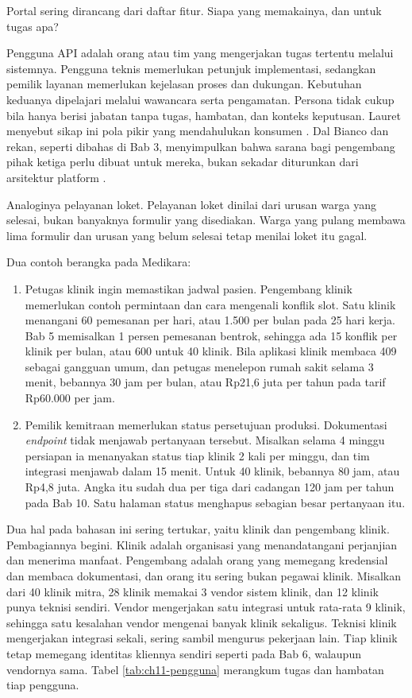 Portal sering dirancang dari daftar fitur. Siapa yang memakainya, dan untuk tugas apa?

Pengguna API adalah orang atau tim yang mengerjakan tugas tertentu melalui sistemnya. Pengguna teknis memerlukan petunjuk
implementasi, sedangkan pemilik layanan memerlukan kejelasan proses dan dukungan. Kebutuhan keduanya dipelajari melalui
wawancara serta pengamatan. Persona tidak cukup bila hanya berisi jabatan tanpa tugas, hambatan, dan konteks keputusan.
Lauret menyebut sikap ini pola pikir yang mendahulukan konsumen \cite{lauret2025design}. Dal Bianco dan rekan, seperti
dibahas di Bab 3, menyimpulkan bahwa sarana bagi pengembang pihak ketiga perlu dibuat untuk mereka, bukan sekadar
diturunkan dari arsitektur platform \cite{dalbianco2014role}.

Analoginya pelayanan loket. Pelayanan loket dinilai dari urusan warga yang selesai, bukan banyaknya formulir yang
disediakan. Warga yang pulang membawa lima formulir dan urusan yang belum selesai tetap menilai loket itu gagal.

Dua contoh berangka pada Medikara:
\begin{enumerate}
  \item Petugas klinik ingin memastikan jadwal pasien. Pengembang klinik memerlukan contoh permintaan dan cara mengenali
        konflik slot. Satu klinik menangani 60 pemesanan per hari, atau 1.500 per bulan pada 25 hari kerja. Bab 5
        memisalkan 1 persen pemesanan bentrok, sehingga ada 15 konflik per klinik per bulan, atau 600 untuk 40 klinik.
        Bila aplikasi klinik membaca 409 sebagai gangguan umum, dan petugas menelepon rumah sakit selama 3 menit,
        bebannya 30 jam per bulan, atau Rp21,6 juta per tahun pada tarif Rp60.000 per jam.
  \item Pemilik kemitraan memerlukan status persetujuan produksi. Dokumentasi \textit{endpoint} tidak menjawab
        pertanyaan tersebut. Misalkan selama 4 minggu persiapan ia menanyakan status tiap klinik 2 kali per minggu, dan
        tim integrasi menjawab dalam 15 menit. Untuk 40 klinik, bebannya 80 jam, atau Rp4,8 juta. Angka itu sudah dua
        per tiga dari cadangan 120 jam per tahun pada Bab 10. Satu halaman status menghapus sebagian besar pertanyaan itu.
\end{enumerate}

Dua hal pada bahasan ini sering tertukar, yaitu klinik dan pengembang klinik. Pembagiannya begini. Klinik adalah
organisasi yang menandatangani perjanjian dan menerima manfaat. Pengembang adalah orang yang memegang kredensial dan
membaca dokumentasi, dan orang itu sering bukan pegawai klinik. Misalkan dari 40 klinik mitra, 28 klinik memakai 3 vendor
sistem klinik, dan 12 klinik punya teknisi sendiri. Vendor mengerjakan satu integrasi untuk rata-rata 9 klinik, sehingga
satu kesalahan vendor mengenai banyak klinik sekaligus. Teknisi klinik mengerjakan integrasi sekali, sering sambil
mengurus pekerjaan lain. Tiap klinik tetap memegang identitas kliennya sendiri seperti pada Bab 6, walaupun vendornya
sama. Tabel \ref{tab:ch11-pengguna} merangkum tugas dan hambatan tiap pengguna.

